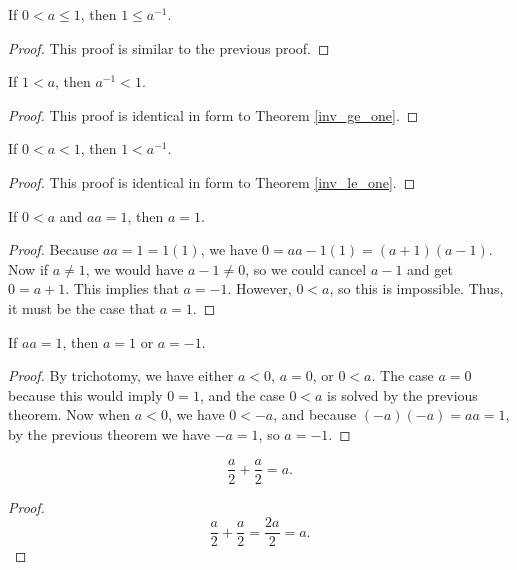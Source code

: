 \documentclass[../../math.tex]{subfiles}
\begin{document}
\begin{theorem} \label{inv_le_one}
    If $0 < a \leq 1$, then $1 \leq a^{-1}$.
\end{theorem}
\begin{proof}
    This proof is similar to the previous proof.
\end{proof}

\begin{theorem}
    If $1 < a$, then $a^{-1} < 1$.
\end{theorem}
\begin{proof}
    This proof is identical in form to Theorem \ref{inv_ge_one}.
\end{proof}

\begin{theorem}
    If $0 < a < 1$, then $1 < a^{-1}$.
\end{theorem}
\begin{proof}
    This proof is identical in form to Theorem \ref{inv_le_one}.
\end{proof}

\begin{theorem}
    If $0 < a$ and $aa = 1$, then $a = 1$.
\end{theorem}
\begin{proof}
    Because $aa = 1 = 1(1)$, we have $0 = aa - 1(1) = (a + 1)(a - 1)$.  Now if
    $a \neq 1$, we would have $a - 1 \neq 0$, so we could cancel $a - 1$ and get
    $0 = a + 1$.  This implies that $a = -1$.  However, $0 < a$, so this is
    impossible.  Thus, it must be the case that $a = 1$.
\end{proof}

\begin{theorem}
    If $aa = 1$, then $a = 1$ or $a = -1$.
\end{theorem}
\begin{proof}
    By trichotomy, we have either $a < 0$, $a = 0$, or $0 < a$.  The case $a =
    0$ because this would imply $0 = 1$, and the case $0 < a$ is solved by the
    previous theorem.  Now when $a < 0$, we have $0 < -a$, and because $(-a)(-a)
    = aa = 1$, by the previous theorem we have $-a = 1$, so $a = -1$.
\end{proof}

\begin{theorem}
    \[
        \frac{a}{2} + \frac{a}{2} = a.
    \]
\end{theorem}
\begin{proof}
    \[
        \frac{a}{2} + \frac{a}{2} = \frac{2a}{2} = a.
    \]
\end{proof}
\end{document}
